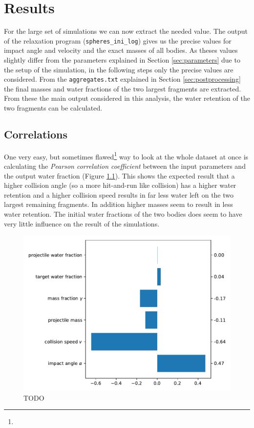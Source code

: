 \chapter{Results}

For the large set of simulations we can now extract the needed value. The output of the relaxation program (\texttt{spheres\_ini\_log}) gives us the precise values for impact angle and velocity and the exact masses of all bodies. As theses values slightly differ from the parameters explained in Section \ref{sec:parameters} due to the setup of the simulation, in the following steps only the precise values are considered. From the \texttt{aggregates.txt} explained in Section \ref{sec:postprocessing} the final masses and water fractions of the two largest fragments are extracted. From these the main output considered in this analysis, the water retention of the two fragments can be calculated. 


\section{Correlations}
\label{sec:cov}
One very easy, but sometimes flawed\footnote{} way to look at the whole dataset at once is calculating the \textit{Pearson correlation coefficient} between the input parameters and the output water fraction (Figure \ref{fig:cov}). This shows the expected result that a higher collision angle (so a more hit-and-run like collision) has a higher water retention and a higher collision speed results in far less water left on the two largest remaining fragments. In addition higher masses seem to result in less water retention. The initial water fractions of the two bodies does seem to have very little influence on the result of the simulations.

\begin{figure}[h] %
	\centering
	\includegraphics[width=0.8\linewidth]{images/cov.pdf}
	\caption{TODO}
	\label{fig:cov}
\end{figure}